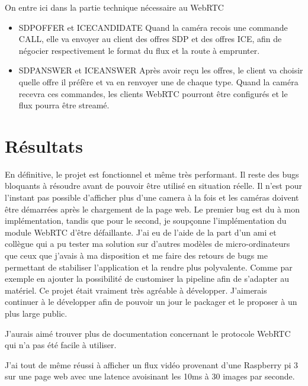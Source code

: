 \documentclass[12pt, a4paper]{report}
\begin{document}
On entre ici dans la partie technique nécessaire au WebRTC\newline
\begin{itemize}
    \item SDP\textunderscore OFFER et ICE\textunderscore CANDIDATE\newline
        Quand la caméra recois une commande CALL, elle va envoyer au client des offres SDP et des offres ICE, afin de négocier respectivement le format du flux et la route à emprunter.\newline

    \item SDP\textunderscore ANSWER et ICE\textunderscore ANSWER\newline
        Après avoir reçu les offres, le client va choisir quelle offre il préfère et va en renvoyer une de chaque type.\newline
        Quand la caméra recevra ces commandes, les clients WebRTC pourront être configurés et le flux pourra être streamé.

\end{itemize}

\chapter{Résultats}
En définitive, le projet est fonctionnel et même très performant.\newline
Il reste des bugs bloquants à résoudre avant de pouvoir être utilisé en situation réelle.\newline
Il n'est pour l'instant pas possible d'afficher plus d'une camera à la fois et les caméras doivent être démarrées après le chargement de la page web. Le premier bug est du à mon implémentation, tandis que pour le second, je soupçonne l'implémentation du module WebRTC d'être défaillante.\newline
J'ai eu de l'aide de la part d'un ami et collègue qui a pu tester ma solution sur d'autres modèles de micro-ordinateurs que ceux que j'avais à ma disposition et me faire des retours de bugs me permettant de stabiliser l'application et la rendre plus polyvalente. Comme par exemple en ajouter la possibilité de customiser la pipeline afin de s'adapter au matériel.\newline
Ce projet était vraiment très agréable à développer. J'aimerais continuer à le développer afin de pouvoir un jour le packager et le proposer à un plus large public.\newline

J'aurais aimé trouver plus de documentation concernant le protocole WebRTC qui n'a pas été facile à utiliser.

J'ai tout de même réussi à afficher un flux vidéo provenant d'une Raspberry pi 3 sur une page web avec une latence avoisinant les 10ms à 30 images par seconde.
\end{document}
